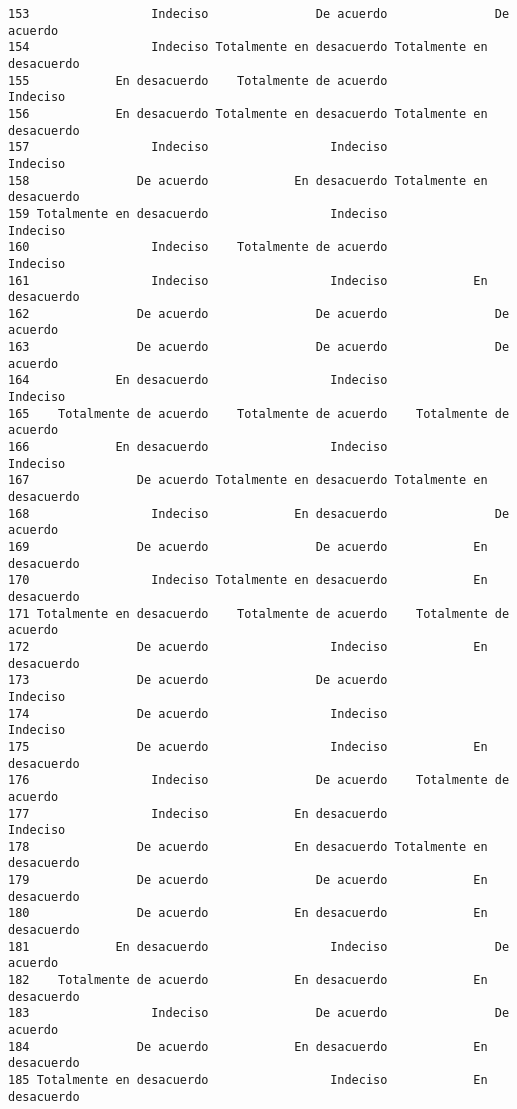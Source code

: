 \documentclass[
  letterpaper,
  DIV=11,
  numbers=noendperiod]{scrartcl}
\begin{document}
\begin{verbatim}
153                 Indeciso               De acuerdo               De acuerdo
154                 Indeciso Totalmente en desacuerdo Totalmente en desacuerdo
155            En desacuerdo    Totalmente de acuerdo                 Indeciso
156            En desacuerdo Totalmente en desacuerdo Totalmente en desacuerdo
157                 Indeciso                 Indeciso                 Indeciso
158               De acuerdo            En desacuerdo Totalmente en desacuerdo
159 Totalmente en desacuerdo                 Indeciso                 Indeciso
160                 Indeciso    Totalmente de acuerdo                 Indeciso
161                 Indeciso                 Indeciso            En desacuerdo
162               De acuerdo               De acuerdo               De acuerdo
163               De acuerdo               De acuerdo               De acuerdo
164            En desacuerdo                 Indeciso                 Indeciso
165    Totalmente de acuerdo    Totalmente de acuerdo    Totalmente de acuerdo
166            En desacuerdo                 Indeciso                 Indeciso
167               De acuerdo Totalmente en desacuerdo Totalmente en desacuerdo
168                 Indeciso            En desacuerdo               De acuerdo
169               De acuerdo               De acuerdo            En desacuerdo
170                 Indeciso Totalmente en desacuerdo            En desacuerdo
171 Totalmente en desacuerdo    Totalmente de acuerdo    Totalmente de acuerdo
172               De acuerdo                 Indeciso            En desacuerdo
173               De acuerdo               De acuerdo                 Indeciso
174               De acuerdo                 Indeciso                 Indeciso
175               De acuerdo                 Indeciso            En desacuerdo
176                 Indeciso               De acuerdo    Totalmente de acuerdo
177                 Indeciso            En desacuerdo                 Indeciso
178               De acuerdo            En desacuerdo Totalmente en desacuerdo
179               De acuerdo               De acuerdo            En desacuerdo
180               De acuerdo            En desacuerdo            En desacuerdo
181            En desacuerdo                 Indeciso               De acuerdo
182    Totalmente de acuerdo            En desacuerdo            En desacuerdo
183                 Indeciso               De acuerdo               De acuerdo
184               De acuerdo            En desacuerdo            En desacuerdo
185 Totalmente en desacuerdo                 Indeciso            En desacuerdo

\end{verbatim}
\end{document}
